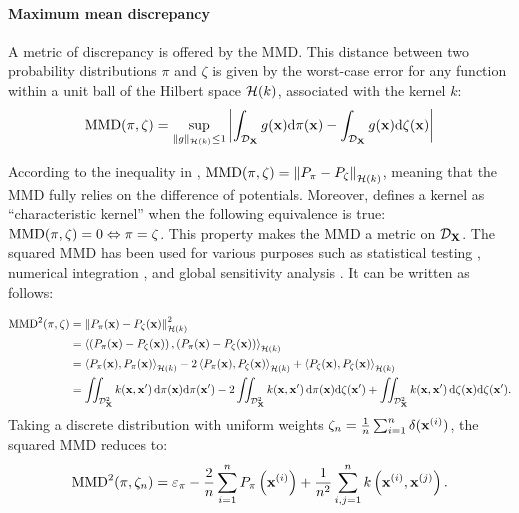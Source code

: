 \paragraph{Maximum mean discrepancy}
A metric of discrepancy is offered by the MMD. 
This distance between two probability distributions $\pi$ and $\zeta$ is given by the worst-case error for any function within a unit ball of the Hilbert space $\mathcal{H}(k)$, associated with the kernel $k$:
\begin{equation}
    \MMD(\pi, \zeta) = %
    \sup_{\lVert g \lVert_{\iH(k)} \leq 1}
            \left | \int_{\iD_{\bX}} g(\bx) \dd \pi(\bx) - \int_{\iD_{\bX}} g(\bx) \dd \zeta(\bx) \right| %
    \label{eq:mmd_c4}  
\end{equation}

According to the inequality in , $\mathrm{MMD}(\pi, \zeta) = \left\lVert P_{\pi} - P_{\zeta} \right\lVert_{\mathcal{H}(k)}$, meaning that the MMD fully relies on the difference of potentials. 
Moreover, \cite{sriperumbudur_2010} defines a kernel as ``characteristic kernel'' when the following equivalence is true: $\mathrm{MMD}(\pi, \zeta) = 0 \Leftrightarrow \pi = \zeta$. 
This property makes the MMD a metric on $\mathcal{D}_{{\bf X}}$. 
The squared MMD has been used for various purposes such as statistical testing \citep{gretton_2006}, numerical integration \citep{chen_welling_2010}, and global sensitivity analysis \citep{daveiga_2015}. 
It can be written as follows:

\begin{subequations}
\begin{align}
    \mathrm{MMD}^2(\pi, \zeta) &= \left\lVert P_{\pi}({\bf x}) - P_{\zeta}({\bf x}) \right\lVert^2_{\mathcal{H}(k)}\\
        &= \left\langle \left(P_{\pi}({\bf x}) - P_{\zeta}({\bf x}) \right), \left(P_{\pi}({\bf x}) - P_{\zeta}({\bf x}) \right) \right\rangle_{\mathcal{H}(k)}\\
        &= \left\langle P_{\pi}({\bf x}), P_{\pi}({\bf x}) \right\rangle_{\mathcal{H}(k)} - 2 \left\langle P_{\pi}({\bf x}), P_{\zeta}({\bf x}) \right\rangle_{\mathcal{H}(k)} + \left\langle P_{\zeta}({\bf x}), P_{\zeta}({\bf x}) \right\rangle_{\mathcal{H}(k)}\\
        &= \iint_{\mathcal{D}_{{\bf X}}^2} k({\bf x}, {\bf x}')\, \mathrm{d}\pi({\bf x}) \mathrm{d}\pi({\bf x}') - 2 \iint_{\mathcal{D}_{{\bf X}}^2} k({\bf x}, {\bf x}')\, \mathrm{d}\pi({\bf x}) \mathrm{d}\zeta({\bf x}') + \iint_{\mathcal{D}_{{\bf X}}^2} k({\bf x}, {\bf x}')\, \mathrm{d}\zeta({\bf x}) \mathrm{d}\zeta({\bf x}').
        \label{eq:mmd_integral}
\end{align}
\end{subequations}
Taking a discrete distribution with uniform weights $\zeta_n= \frac{1}{n} \sum_{i=1}^{n} \delta({\bf x}^{(i)})$, the squared MMD reduces to: 
\begin{equation}\label{eq:mmd_design}
    \mathrm{MMD}^2(\pi, \zeta_n) = \varepsilon_\pi - \frac{2}{n} \sum_{i=1}^n P_{\pi}\left({\bf x}^{(i)}\right) + \frac{1}{n^2} \sum_{i, j=1}^n k\left({\bf x}^{(i)}, {\bf x}^{(j)}\right).
\end{equation}





